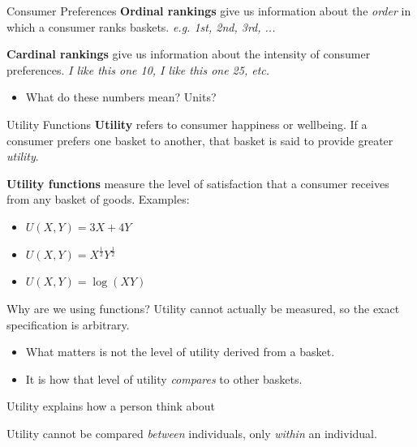 \documentclass{beamer}
\begin{document}
\begin{frame}{Consumer Preferences}
  \textbf{Ordinal rankings} give us information about the \textit{order} in which a consumer ranks baskets. \emph{e.g. 1st, 2nd, 3rd, ...}


  \bigskip
  \textbf{Cardinal rankings} give us information about the intensity of consumer preferences. \emph{I like this one 10, I like this one 25, etc.}

  \begin{itemize}
    \item What do these numbers mean? Units?
  \end{itemize}
\end{frame}

\begin{frame}{Utility Functions}
  \textbf{Utility} refers to consumer happiness or wellbeing. If a consumer prefers one basket to another, that basket is said to provide greater \textit{utility}.
  
  \bigskip
  \textbf{Utility functions} measure the level of satisfaction that a consumer receives from any basket of goods. Examples:
  \begin{itemize}
    \item $U(X,Y) = 3X + 4Y$
    \item $U(X,Y) = X^{\frac{1}{2}}Y^{\frac{1}{2}}$
    \item $U(X,Y) = \log(XY)$
  \end{itemize}
\end{frame}

\begin{frame}{Why are we using functions?}
  Utility cannot actually be measured, so the exact specification is arbitrary.

  \begin{itemize}
    \item What matters is not the level of utility derived from a basket.
    
    \item It is how that level of utility \textit{compares} to other baskets. 
  \end{itemize}

  \bigskip 
  Utility explains how a person think about 

  \bigskip 
  Utility cannot be compared \textit{between} individuals, only \textit{within} an individual. 

\end{frame}
\end{document}
